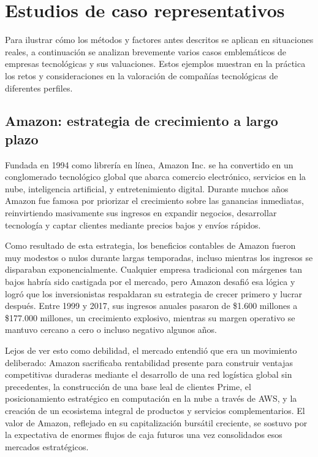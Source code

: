 \section{Estudios de caso representativos}

Para ilustrar cómo los métodos y factores antes descritos se aplican en situaciones reales, a continuación se analizan brevemente varios casos emblemáticos de empresas tecnológicas y sus valuaciones. Estos ejemplos muestran en la práctica los retos y consideraciones en la valoración de compañías tecnológicas de diferentes perfiles.

\subsection{Amazon: estrategia de crecimiento a largo plazo}

Fundada en 1994 como librería en línea, Amazon Inc. se ha convertido en un conglomerado tecnológico global que abarca comercio electrónico, servicios en la nube, inteligencia artificial, y entretenimiento digital. Durante muchos años Amazon fue famosa por priorizar el crecimiento sobre las ganancias inmediatas, reinvirtiendo masivamente sus ingresos en expandir negocios, desarrollar tecnología y captar clientes mediante precios bajos y envíos rápidos.

Como resultado de esta estrategia, los beneficios contables de Amazon fueron muy modestos o nulos durante largas temporadas, incluso mientras los ingresos se disparaban exponencialmente. Cualquier empresa tradicional con márgenes tan bajos habría sido castigada por el mercado, pero Amazon desafió esa lógica y logró que los inversionistas respaldaran su estrategia de crecer primero y lucrar después. Entre 1999 y 2017, sus ingresos anuales pasaron de \$1.600 millones a \$177.000 millones, un crecimiento explosivo, mientras su margen operativo se mantuvo cercano a cero o incluso negativo algunos años.

Lejos de ver esto como debilidad, el mercado entendió que era un movimiento deliberado: Amazon sacrificaba rentabilidad presente para construir ventajas competitivas duraderas mediante el desarrollo de una red logística global sin precedentes, la construcción de una base leal de clientes Prime, el posicionamiento estratégico en computación en la nube a través de AWS, y la creación de un ecosistema integral de productos y servicios complementarios. El valor de Amazon, reflejado en su capitalización bursátil creciente, se sostuvo por la expectativa de enormes flujos de caja futuros una vez consolidados esos mercados estratégicos.


